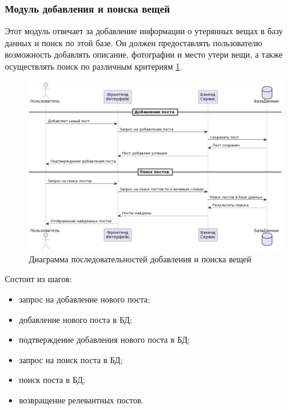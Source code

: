 \subsubsection{Модуль добавления и поиска вещей}

Этот модуль отвечает за добавление информации о утерянных вещах в базу данных и поиск по этой базе. Он должен предоставлять пользователю возможность добавлять описание, фотографии и место утери вещи, а также осуществлять поиск по различным критериям \ref{fig:searchDiagram}.

\begin{figure}[htb]
	\centering
	\includegraphics[width=\textwidth]{images/seach-diagram.png}
	\parskip=6pt
	\caption{Диаграмма последовательностей добавления и поиска вещей}
	\label{fig:searchDiagram}
\end{figure}

Состоит из шагов:
\begin{itemize}
	\item запрос на добавление нового поста;
	\item добавление нового поста в БД;
	\item подтверждение добавления нового поста в БД;
	\item запрос на поиск поста в БД;
	\item поиск поста в БД;
	\item возвращение релевантных постов.
\end{itemize}

